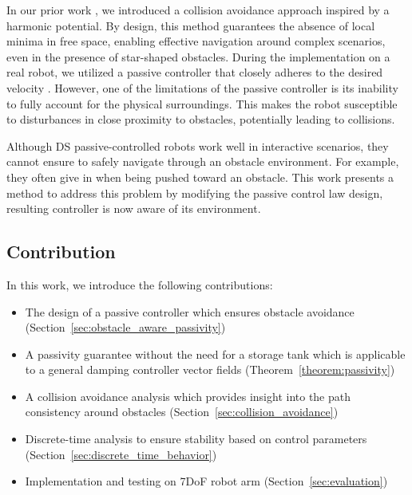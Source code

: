 In our prior work \cite{huber2019avoidance, huber2023avoidance}, we introduced a collision avoidance approach inspired by a harmonic potential. By design, this method guarantees the absence of local minima in free space, enabling effective navigation around complex scenarios, even in the presence of star-shaped obstacles.
During the implementation on a real robot, we utilized a passive controller that closely adheres to the desired velocity \cite{kronander2015passive}. However, one of the limitations of the passive controller is its inability to fully account for the physical surroundings. This makes the robot susceptible to disturbances in close proximity to obstacles, potentially leading to collisions.


Although DS passive-controlled robots work well in interactive scenarios, they cannot ensure to safely navigate through an obstacle environment. For example, they often give in when being pushed toward an obstacle. This work presents a method to address this problem by modifying the passive control law design, resulting controller is now aware of its environment.

\subsection{Contribution}
In this work, we introduce the following contributions:
\begin{itemize}
\item The design of a passive controller which ensures obstacle avoidance (Section~\ref{sec:obstacle_aware_passivity})
\item A passivity guarantee without the need for a storage tank which is applicable to a general damping controller vector fields (Theorem~\ref{theorem:passivity})
\item A collision avoidance analysis which provides insight into the path consistency around obstacles (Section~\ref{sec:collision_avoidance})
\item Discrete-time analysis to ensure stability based on control parameters (Section~\ref{sec:discrete_time_behavior})
\item Implementation and testing on 7DoF robot arm (Section~\ref{sec:evaluation})
\end{itemize}
